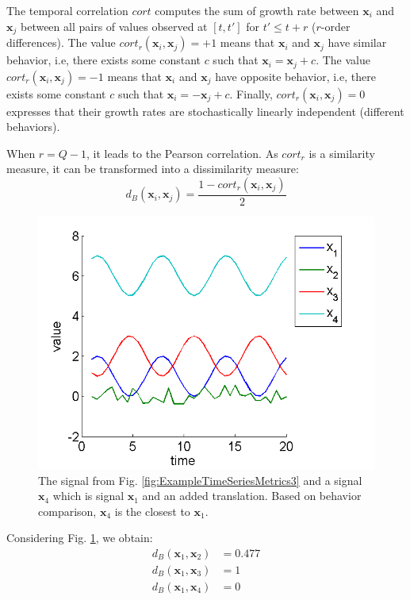 The temporal correlation $cort$ computes the sum of growth rate between $\textbf{x}_i$ and $\textbf{x}_j$ between all pairs of values observed at $[t ,t']$ for $t' \leq t+r$ ($r$-order differences). The value $cort_r(\textbf{x}_i,\textbf{x}_j) = +1$ means that $\textbf{x}_i$ and $\textbf{x}_j$  have similar behavior, i.e, there exists some constant $c$ such that $\textbf{x}_i = \textbf{x}_j+c$. The value $cort_r(\textbf{x}_i,\textbf{x}_j) = -1$ means that $\textbf{x}_i$ and $\textbf{x}_j$ have opposite behavior, i.e, there exists some constant $c$ such that $\textbf{x}_i = -\textbf{x}_j+c$. Finally, $cort_r(\textbf{x}_i,\textbf{x}_j) = 0$ expresses that their growth rates are stochastically linearly independent (different behaviors). 

When $r=Q-1$, it leads to the Pearson correlation. As $cort_r$ is a similarity measure, it can be transformed into a dissimilarity measure:
\begin{equation}
	d_B(\textbf{x}_i,\textbf{x}_j) = \frac{1 - cort_r(\textbf{x}_i,\textbf{x}_j)}{2}
	\label{eq:B}
\end{equation}

\begin{figure}[h!]
	\centering
	\includegraphics[width=0.7\linewidth]{images/ExampleTimeSeriesMetrics4}
	\caption{The signal from Fig. \ref{fig:ExampleTimeSeriesMetrics3} and a signal $\textbf{x}_4$ which is signal $\textbf{x}_1$ and an added translation. Based on behavior comparison, $\textbf{x}_4$ is the closest to $\textbf{x}_1$.}
	\label{fig:ExampleTimeSeriesMetrics4}
\end{figure}

\noindent Considering Fig. \ref{fig:ExampleTimeSeriesMetrics4}, we obtain:
\begin{align*}
d_B(\textbf{x}_1,\textbf{x}_2) &= 0.477 \\  
d_B(\textbf{x}_1,\textbf{x}_3) &= 1 \\  
d_B(\textbf{x}_1,\textbf{x}_4) &= 0 \\ 
\label{key}
\end{align*}  

